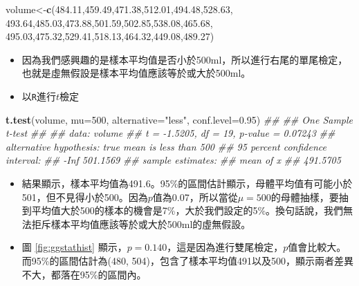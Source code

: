 \documentclass[hyperref,]{ctexart}
\newenvironment{Shaded}{\begin{snugshade}}{\end{snugshade}}
\newcommand{\CommentTok}[1]{\textcolor[rgb]{0.56,0.35,0.01}{\textit{#1}}}
\newcommand{\DataTypeTok}[1]{\textcolor[rgb]{0.13,0.29,0.53}{#1}}
\newcommand{\DecValTok}[1]{\textcolor[rgb]{0.00,0.00,0.81}{#1}}
\newcommand{\FloatTok}[1]{\textcolor[rgb]{0.00,0.00,0.81}{#1}}
\newcommand{\KeywordTok}[1]{\textcolor[rgb]{0.13,0.29,0.53}{\textbf{#1}}}
\newcommand{\NormalTok}[1]{#1}
\newcommand{\StringTok}[1]{\textcolor[rgb]{0.31,0.60,0.02}{#1}}
\begin{document}
\begin{Shaded}
\begin{Highlighting}[]
\NormalTok{volume<-}\KeywordTok{c}\NormalTok{(}\FloatTok{484.11}\NormalTok{,}\FloatTok{459.49}\NormalTok{,}\FloatTok{471.38}\NormalTok{,}\FloatTok{512.01}\NormalTok{,}\FloatTok{494.48}\NormalTok{,}\FloatTok{528.63}\NormalTok{,}
  \FloatTok{493.64}\NormalTok{,}\FloatTok{485.03}\NormalTok{,}\FloatTok{473.88}\NormalTok{,}\FloatTok{501.59}\NormalTok{,}\FloatTok{502.85}\NormalTok{,}\FloatTok{538.08}\NormalTok{,}\FloatTok{465.68}\NormalTok{,}
  \FloatTok{495.03}\NormalTok{,}\FloatTok{475.32}\NormalTok{,}\FloatTok{529.41}\NormalTok{,}\FloatTok{518.13}\NormalTok{,}\FloatTok{464.32}\NormalTok{,}\FloatTok{449.08}\NormalTok{,}\FloatTok{489.27}\NormalTok{)}
\end{Highlighting}
\end{Shaded}

\begin{itemize}
\item
  因為我們感興趣的是樣本平均值是否小於500ml，所以進行右尾的單尾檢定，也就是虛無假設是樣本平均值應該等於或大於500ml。
\item
  以\texttt{R}進行\(t\)檢定
\end{itemize}

\begin{Shaded}
\begin{Highlighting}[]
\KeywordTok{t.test}\NormalTok{(volume, }\DataTypeTok{mu=}\DecValTok{500}\NormalTok{, }\DataTypeTok{alternative=}\StringTok{"less"}\NormalTok{, }
       \DataTypeTok{conf.level=}\FloatTok{0.95}\NormalTok{)}
\CommentTok{## }
\CommentTok{##  One Sample t-test}
\CommentTok{## }
\CommentTok{## data:  volume}
\CommentTok{## t = -1.5205, df = 19, p-value = 0.07243}
\CommentTok{## alternative hypothesis: true mean is less than 500}
\CommentTok{## 95 percent confidence interval:}
\CommentTok{##      -Inf 501.1569}
\CommentTok{## sample estimates:}
\CommentTok{## mean of x }
\CommentTok{##  491.5705}
\end{Highlighting}
\end{Shaded}

\begin{itemize}
\item
  結果顯示，樣本平均值為491.6。95\%的區間估計顯示，母體平均值有可能小於501，但不見得小於500。因為\(p\)值為0.07，所以當從\(\mu=500\)的母體抽樣，要抽到平均值大於500的樣本的機會是7\%，大於我們設定的5\%。換句話說，我們無法拒斥樣本平均值應該等於或大於500ml的虛無假設。
\item
  圖 \ref{fig:ggstathist}
  顯示，\(p=0.140\)，這是因為進行雙尾檢定，\(p\)值會比較大。而95\%的區間估計為(480,
  504)，包含了樣本平均值491以及500，顯示兩者差異不大，都落在95\%的區間內。
\end{itemize}
\end{document}
